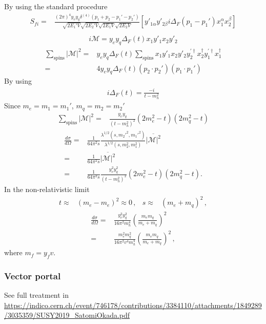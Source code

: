 \begin{frame}
By using the standard procedure
\begin{align}
      S_{fi}
    =&\frac{(2\pi)^4y_e y_q \delta^{(4)}\left(p_1+p_2-p_1'-p_2'\right) }{\sqrt{2 E_1'V}\sqrt{2 E_2'V}\sqrt{2 E_1V}\sqrt{2 E_2V}}
 \left[y'_{1\alpha}y'_{2\beta}i\Delta_F(p_1-p_1')x_1^{\alpha}x_2^{\beta}\right] \nonumber\\
\end{align}
\begin{align}
 i\mathcal{M}=y_e y_q\Delta_F(t) x_1y'_1x_2y'_2 
\end{align}
\begin{align}
\sum_{\text{spins}} |\mathcal{M}|^2=&y_e y_q\Delta_F(t) \sum_{\text{spins}}  x_1y'_1x_2y'_2  y^{\prime\dagger}_2x_2^{\dagger} y^{\prime\dagger}_1x^{\dagger}_1 \nonumber\\
=& 4 y_e y_q\Delta_F(t) \left( p_2\cdot p_2' \right) \left(p_1\cdot p_1'  \right)
\end{align}
By using
\begin{align}
  i\Delta_F(t)=\frac{-i}{t-m_h^2}
\end{align}
Since $m_e=m_1=m_1'$, $m_q=m_2=m_2'$
\begin{align}
   \sum_{\text{spins}} |\mathcal{M}|^2=&\frac{y_ey_q}{\left( t-m_h^2 \right)^2} \left(2m_e^2-t\right)\left(2m_q^2-t\right)
\end{align}
\begin{align}
     \frac{d\sigma}{d\Omega}=&\frac{1}{64\pi^2s}
\frac{\lambda^{1/2}(s,{m_2'}^2,{m_1'}^2)}{\lambda^{1/2}(s,m_2^2,m_1^2)}
\overline{|\mathcal{M}|^2} \nonumber\\
=&\frac{1}{64\pi^2s}\overline{|\mathcal{M}|^2} \nonumber\\
=&\frac{1}{64\pi^2s}\frac{y_e^2y_q^2}{\left( t-m_h^2 \right)^2}\left(2m_e^2-t\right)\left(2m_q^2-t\right) .
\end{align}
In the non-relativistic limit
\begin{align}
  t\approx& (m_e-m_e)^2\approx 0\,,& 
  s\approx& (m_e+m_q)^2\,,
\end{align}
\begin{align}
       \frac{d\sigma}{d\Omega}
                    =&\frac{y_e^2y_q^2}{16\pi^2m_h^4}\left( \frac{m_em_q}{m_e+m_q} \right)^2 \nonumber\\
=&\frac{m_e^2m_q^2}{16\pi^2v^4 m_h^4}\left( \frac{m_em_q}{m_e+m_q} \right)^2\,,
\end{align}
where $m_f=y_f v$.

\subsubsection{Vector portal}
See full treatment in \url{https://indico.cern.ch/event/746178/contributions/3384110/attachments/1849289/3035359/SUSY2019_SatomiOkada.pdf}

\end{frame}

